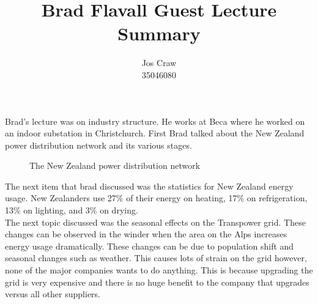 \documentclass{article}
\title{Brad Flavall Guest Lecture Summary}
\author{Jos Craw\\35046080}
\begin{document}
\maketitle{}

Brad's lecture was on industry structure. He works at Beca where he worked on an indoor substation
in Christchurch. First Brad talked about the New Zealand power distribution network and its
various stages.\\

\begin{figure}[h]
\caption{The New Zealand power distribution network}
\end{figure}

The next item that brad discussed was the statistics for New Zealand energy usage. New Zealanders
use 27\% of their energy on heating, 17\% on refrigeration, 13\% on lighting, and 3\% on drying.\\ 

The next topic discussed was the seasonal effects on the Transpower grid. These changes can be
observed in the winder when the area on the Alps increases energy usage dramatically. These
changes can be due to population shift and seasonal changes such as weather. This causes lots of
strain on the grid however, none of the major companies wants to do anything. This is because
upgrading the grid is very expensive and there is no huge benefit to the company that upgrades 
versus all other suppliers.\\
\end{document}
